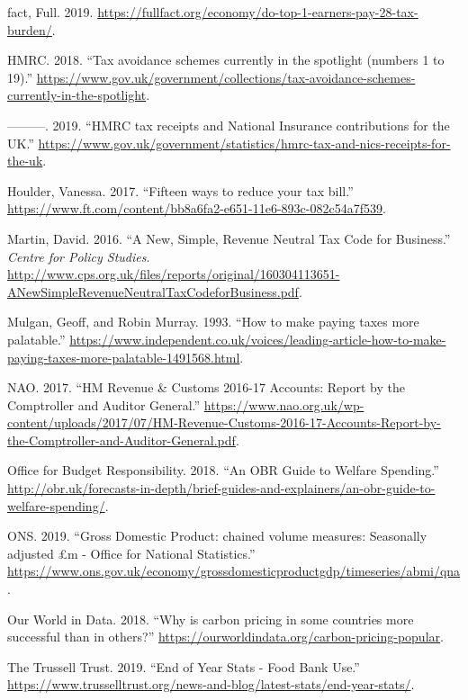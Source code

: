 \documentclass[]{article}
\begin{document}
\hypertarget{refs}{}
\leavevmode\hypertarget{ref-FullFact2019}{}%
fact, Full. 2019.
\url{https://fullfact.org/economy/do-top-1-earners-pay-28-tax-burden/}.

\leavevmode\hypertarget{ref-HMRC2018b}{}%
HMRC. 2018. ``Tax avoidance schemes currently in the spotlight (numbers
1 to 19).''
\url{https://www.gov.uk/government/collections/tax-avoidance-schemes-currently-in-the-spotlight}.

\leavevmode\hypertarget{ref-HMRC2019}{}%
---------. 2019. ``HMRC tax receipts and National Insurance
contributions for the UK.''
\url{https://www.gov.uk/government/statistics/hmrc-tax-and-nics-receipts-for-the-uk}.

\leavevmode\hypertarget{ref-Houlder2017}{}%
Houlder, Vanessa. 2017. ``Fifteen ways to reduce your tax bill.''
\url{https://www.ft.com/content/bb8a6fa2-e651-11e6-893c-082c54a7f539}.

\leavevmode\hypertarget{ref-Martin}{}%
Martin, David. 2016. ``A New, Simple, Revenue Neutral Tax Code for
Business.'' \emph{Centre for Policy Studies}.
\url{http://www.cps.org.uk/files/reports/original/160304113651-ANewSimpleRevenueNeutralTaxCodeforBusiness.pdf}.

\leavevmode\hypertarget{ref-Mulgan1993}{}%
Mulgan, Geoff, and Robin Murray. 1993. ``How to make paying taxes more
palatable.''
\url{https://www.independent.co.uk/voices/leading-article-how-to-make-paying-taxes-more-palatable-1491568.html}.

\leavevmode\hypertarget{ref-NAO2017}{}%
NAO. 2017. ``HM Revenue \& Customs 2016-17 Accounts: Report by the
Comptroller and Auditor General.''
\url{https://www.nao.org.uk/wp-content/uploads/2017/07/HM-Revenue-Customs-2016-17-Accounts-Report-by-the-Comptroller-and-Auditor-General.pdf}.

\leavevmode\hypertarget{ref-OBR2018}{}%
Office for Budget Responsibility. 2018. ``An OBR Guide to Welfare
Spending.''
\url{http://obr.uk/forecasts-in-depth/brief-guides-and-explainers/an-obr-guide-to-welfare-spending/}.

\leavevmode\hypertarget{ref-ONS2019}{}%
ONS. 2019. ``Gross Domestic Product: chained volume measures: Seasonally
adjusted £m - Office for National Statistics.''
\url{https://www.ons.gov.uk/economy/grossdomesticproductgdp/timeseries/abmi/qna}.

\leavevmode\hypertarget{ref-OurWorldinData2018}{}%
Our World in Data. 2018. ``Why is carbon pricing in some countries more
successful than in others?''
\url{https://ourworldindata.org/carbon-pricing-popular}.

\leavevmode\hypertarget{ref-TheTrussellTrust2019}{}%
The Trussell Trust. 2019. ``End of Year Stats - Food Bank Use.''
\url{https://www.trusselltrust.org/news-and-blog/latest-stats/end-year-stats/}.
\end{document}
